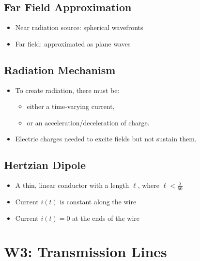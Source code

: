 \documentclass[a4paper]{article}
\begin{document}
\subsection{Far Field Approximation}
\begin{itemize}
    \item Near radiation source: spherical wavefronts
    \item Far field: approximated as plane waves
\end{itemize}

\subsection{Radiation Mechanism}
\begin{itemize}
    \item To create radiation, there must be:
    \begin{itemize}[label=$\circ$]
        \item either a time-varying current,
        \item or an acceleration/deceleration of charge.
    \end{itemize}
    \item Electric charges needed to excite fields but not sustain them.
\end{itemize}

\subsection{Hertzian Dipole}
\begin{itemize}
    \item A thin, linear conductor with a length $\ell$, where $\ell <  \displaystyle\frac{\lambda}{50}$
    \item Current $i(t)$ is constant along the wire
    \item Current $i(t) = 0$ at the ends of the wire
\end{itemize}

\newpage
\section{W3: Transmission Lines}
\end{document}
